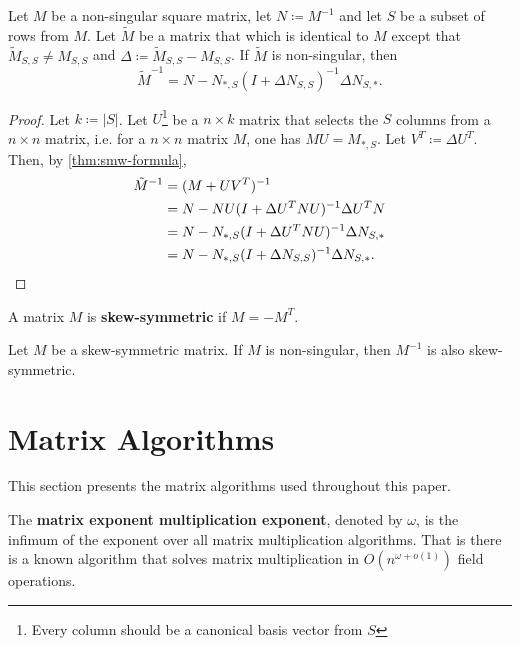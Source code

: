 \begin{corollary}
    \label{cor:update_cor} 
    Let \(M\) be a non-singular square matrix, let \(N \coloneqq M^{-1}\) and let \(S\) be a subset of rows from \(M\).
    Let \(\tilde{M}\) be a matrix that which is identical to \(M\) except that \(\tilde{M}_{S, S} \neq M_{S, S}\)
    and \(\Delta \coloneqq \tilde{M}_{S, S} - M_{S, S}\).
    If \(\tilde{M}\) is non-singular, then
    \[
        \tilde{M}^{-1} = N - N_{*, S}(I + \Delta N_{S, S})^{-1}\Delta N_{S, *}.
    \]
\end{corollary}

\begin{proof}
    Let \(k \coloneqq |S|\). 
    Let \(U\)\footnote{Every column should be a canonical basis vector from \(S\)} be a \(n \times k\) matrix that selects the \(S\) columns from a \(n \times n\) matrix, i.e.
    for a \(n \times n\) matrix \(M\), one has \(MU = M_{*, S}\). Let \(V^T \coloneqq \Delta U^T\). 
    Then, by \cref{thm:smw-formula}, 
    \begin{align*}
        \tilde{M}^{-1} &= (M + U V^T)^{-1} \\
        &= N - N U (I + \Delta U^T N U)^{-1} \Delta U^T N \\
        &= N - N_{*, S} (I + \Delta U^T N U)^{-1} \Delta N_{S, *} \\
        &= N - N_{*, S} (I + \Delta N_{S, S})^{-1} \Delta N_{S, *}. \qedhere
    \end{align*}
\end{proof}

\begin{definition}
\label{def:skew}
    A matrix \(M\) is \textbf{skew-symmetric} if \(M = -M^{T}\).
\end{definition}

\begin{fact}
    Let \(M\) be a skew-symmetric matrix.
    If \(M\) is non-singular, then \(M^{-1}\) is also skew-symmetric.
\end{fact}

\section{Matrix Algorithms}

This section presents the matrix algorithms used throughout this paper.

\begin{definition}
  The \textbf{matrix exponent multiplication exponent}, denoted by \(\omega\), is the infimum of the exponent over all matrix multiplication algorithms.
  That is there is a known algorithm that solves matrix multiplication in \(O(n^{\omega + o(1)})\) field operations.
\end{definition}

